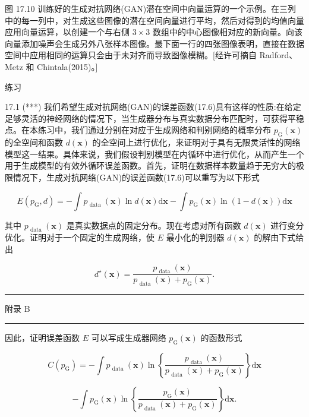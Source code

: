 \documentclass[10pt]{article}
\newcommand{\HRule}{\begin{center}\rule{0.9\linewidth}{0.2mm}\end{center}}
\begin{document}
图 17.10 训练好的生成对抗网络(GAN)潜在空间中向量运算的一个示例。在三列中的每一列中，对生成这些图像的潜在空间向量进行平均，然后对得到的均值向量应用向量运算，以创建一个与右侧 \(3 \times  3\) 数组中的中心图像相对应的新向量。向该向量添加噪声会生成另外八张样本图像。最下面一行的四张图像表明，直接在数据空间中应用相同的运算只会由于未对齐而导致图像模糊。[经许可摘自 Radford、Metz 和 Chintala(2015)。]

练习

17.1 (***) 我们希望生成对抗网络(GAN)的误差函数(17.6)具有这样的性质:在给定足够灵活的神经网络的情况下，当生成器分布与真实数据分布匹配时，可获得平稳点。在本练习中，我们通过分别在对应于生成网络和判别网络的概率分布 \({p}_{\mathrm{G}}\left( \mathbf{x}\right)\) 的全空间和函数 \(d\left( \mathbf{x}\right)\) 的全空间上进行优化，来证明对于具有无限灵活性的网络模型这一结果。具体来说，我们假设判别模型在内循环中进行优化，从而产生一个用于生成模型的有效外循环误差函数。首先，证明在数据样本数量趋于无穷大的极限情况下，生成对抗网络(GAN)的误差函数(17.6)可以重写为以下形式

\[
E\left( {{p}_{\mathrm{G}},d}\right)  =  - \int {p}_{\text{ data }}\left( \mathbf{x}\right) \ln d\left( \mathbf{x}\right) \mathrm{d}\mathbf{x} - \int {p}_{\mathrm{G}}\left( \mathbf{x}\right) \ln \left( {1 - d\left( \mathbf{x}\right) }\right) \mathrm{d}\mathbf{x} \tag{17.14}
\]

其中 \({p}_{\text{ data }}\left( \mathbf{x}\right)\) 是真实数据点的固定分布。现在考虑对所有函数 \(d\left( \mathbf{x}\right)\) 进行变分优化。证明对于一个固定的生成网络，使 \(E\) 最小化的判别器 \(d\left( \mathbf{x}\right)\) 的解由下式给出

\[
{d}^{ \star  }\left( \mathbf{x}\right)  = \frac{{p}_{\text{ data }}\left( \mathbf{x}\right) }{{p}_{\text{ data }}\left( \mathbf{x}\right)  + {p}_{\mathrm{G}}\left( \mathbf{x}\right) }. \tag{17.15}
\]

\HRule

附录 B

\HRule

因此，证明误差函数 \(E\) 可以写成生成器网络 \({p}_{\mathrm{G}}\left( \mathbf{x}\right)\) 的函数形式

\[
C\left( {p}_{\mathrm{G}}\right)  =  - \int {p}_{\text{ data }}\left( \mathbf{x}\right) \ln \left\{  \frac{{p}_{\text{ data }}\left( \mathbf{x}\right) }{{p}_{\text{ data }}\left( \mathbf{x}\right)  + {p}_{\mathrm{G}}\left( \mathbf{x}\right) }\right\}  \mathrm{d}\mathbf{x}
\]

\[
- \int {p}_{\mathrm{G}}\left( \mathbf{x}\right) \ln \left\{  \frac{{p}_{\mathrm{G}}\left( \mathbf{x}\right) }{{p}_{\text{ data }}\left( \mathbf{x}\right)  + {p}_{\mathrm{G}}\left( \mathbf{x}\right) }\right\}  \mathrm{d}\mathbf{x}. \tag{17.16}
\]
\end{document}
